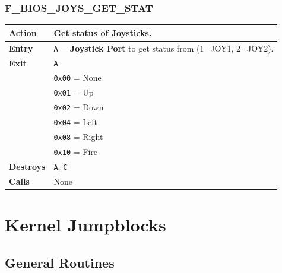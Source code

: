 \documentclass[a4paper,11pt]{article}
\begin{document}
        \subsubsection{F\_BIOS\_JOYS\_GET\_STAT}
        \label{func:fbiosjoysgetstat}
        \begin{tabular}{l p{9cm}}
            \hline\textbf{Action}
            & Get status of Joysticks. \\
            \hline\textbf{Entry} & \texttt{A} = \textbf{Joystick Port} to get
            status from (1=JOY1, 2=JOY2).\\
            \hline\textbf{Exit} & \texttt{A}\\
            & \texttt{0x00} = None\\
            & \texttt{0x01} = Up\\
            & \texttt{0x02} = Down\\
            & \texttt{0x04} = Left\\
            & \texttt{0x08} = Right\\
            & \texttt{0x10} = Fire\\
            \hline\textbf{Destroys} & \texttt{A}, \texttt{C} \\
            \hline\textbf{Calls} & None\\
            \hline
        \end{tabular}

    \pagebreak
    \section{Kernel Jumpblocks}

    \subsection{General Routines}

\end{document}
